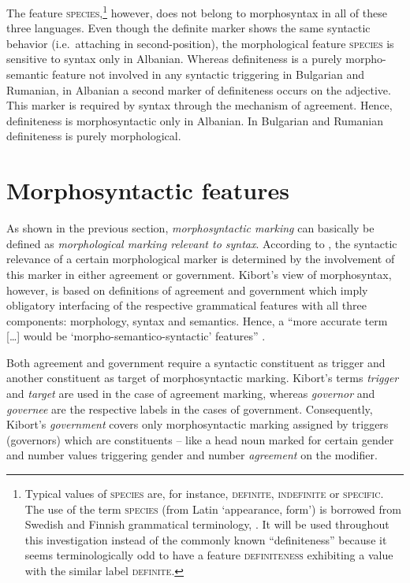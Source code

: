 The feature \textsc{species},\footnote{Typical values of \textsc{species} are, for instance, \textsc{definite, indefinite} or \textsc{specific}. The use of the term \textsc{species} (from Latin ‘appearance, form’) is borrowed from Swedish and Finnish grammatical terminology, \cite[cf., e.g.][]{holm-etal1970,itkonen-t1980a}. It will be used throughout this investigation instead of the commonly known “definiteness” because it seems terminologically odd to have a feature \textsc{definiteness} exhibiting a value with the similar label \textsc{definite}.} however, does not belong to morphosyntax in all of these three languages. Even though the definite marker shows the same syntactic behavior (i.e.~attaching in second-position), the morphological feature \textsc{species} is sensitive to syntax only in Albanian. Whereas definiteness is a purely morpho-semantic feature not involved in any syntactic triggering in Bulgarian and Rumanian, in Albanian a second marker of definiteness occurs on the adjective. This marker is required by syntax through the mechanism of agreement. Hence, definiteness is morphosyntactic only in Albanian. In Bulgarian and Rumanian definiteness is purely morphological.

\section{Morphosyntactic features} \label{crit eval}
As shown in the previous section, \emph{morphosyntactic marking} can basically be defined as \emph{morphological marking relevant to syntax}. According to \cite{kibort2010a}, the syntactic relevance of a certain morphological marker is determined by the involvement of this marker in either agreement or government. Kibort's view of morphosyntax, however, is based on definitions of {agreement} and {government} which imply obligatory interfacing of the respective grammatical features with all three components: morphology, syntax and semantics. Hence, a “more accurate term [\dots] would be ‘morpho-semantico-syntactic’ features” \citep[??]{kibort2010a}.

Both agreement and government require a syntactic constituent as trigger and another constituent as target of morphosyntactic marking. Kibort's terms \emph{trigger} and \emph{target} are used in the case of agreement marking, whereas \emph{governor} and \emph{governee} are the respective labels in the cases of government. Consequently, Kibort's \emph{government} covers only morphosyntactic marking assigned by triggers (governors) which are constituents – like a head noun marked for certain gender and number values triggering gender and number \emph{agreement} on the modifier.

